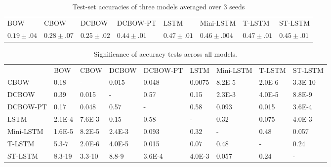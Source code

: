 \begin{table*}[]
    \centering
    \small
    \begin{tabular}{llllllll}
    BOW  & CBOW & DCBOW & DCBOW-PT & LSTM & Mini-LSTM & T-LSTM & ST-LSTM \\
    $0.19\pm .04$ & $0.28\pm .07$ & $0.25\pm .02$ & $0.44\pm .01$ & $0.47\pm .01$ & $0.46\pm .004$ & $0.47\pm .01$ & $0.45\pm .01$ 
    \end{tabular}
    \label{table: results-acc}
    \caption{Test-set accuracies of three models averaged over 3 seeds}
\end{table*}


\begin{table*}[]
    \small
    \begin{tabular}{lllllllll}
                     & BOW     & CBOW     & DCBOW  & DCBOW-PT   & LSTM    &
                     Mini-LSTM & T-LSTM & ST-LSTM \\
        CBOW         & 0.18  &   -   & 0.015  & 0.048 &0.0075&8.2E-5 & 2.0E-6 &3.3E-10     \\
        DCBOW    & 0.39   &  0.015   &  -    &  0.57  & 0.15  & 2.3E-3  & 4.0E-5 & 8.8E-9     \\
        DCBOW-PT & 0.17  &   0.048  &   0.57  &   -  &  0.58 &  0.093  &   0.015  & 3.6E-4 \\
        LSTM         & 2.1E-4 &  7.6E-3 &  0.15  &  0.58 & -  &  0.32  &  0.075  & 4.0E-3      \\
        Mini-LSTM    & 1.6E-5 &  8.2E-5 &  2.4E-3  &  0.093  &  0.32  &   -    &    0.48   &  0.057     \\
        T-LSTM    & 5.3-7  & 2.0E-6 & 4.0E-5 &  0.015  & 0.07  &   0.48   &    -    &   0.24     \\
        ST-LSTM & 8.3-19  &  3.3-10  &  8.8-9  & 3.6E-4 & 4.0E-3 &  0.057   &    0.24   &   -       
        \end{tabular}
    \label{table: sign}
    \caption{Significance of accuracy tests across all models.}
\end{table*}